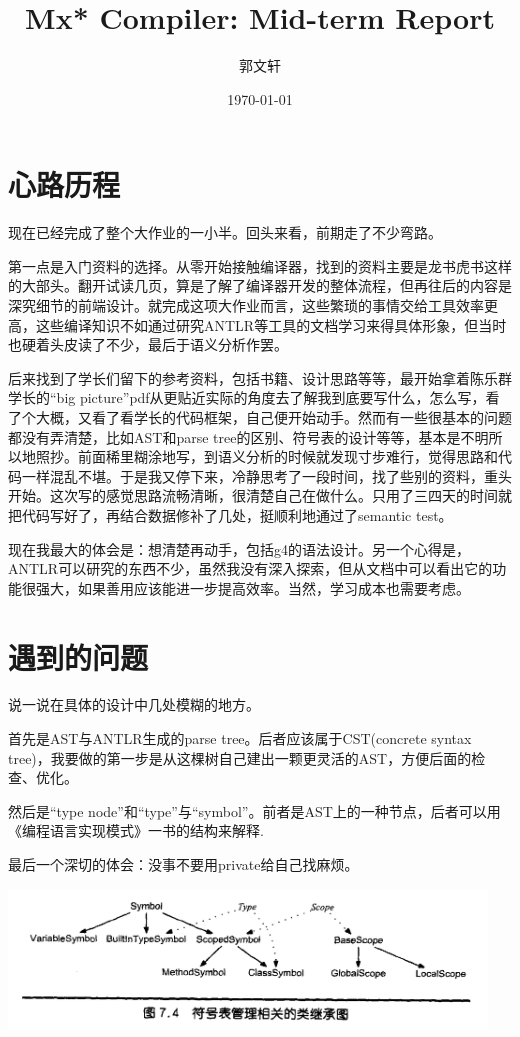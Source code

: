 \documentclass[a4paper]{article}
\title{Mx* Compiler: Mid-term Report}
\author{郭文轩}
\date{\today}
\begin{document}
\maketitle

\section{心路历程}
现在已经完成了整个大作业的一小半。回头来看，前期走了不少弯路。

第一点是入门资料的选择。从零开始接触编译器，找到的资料主要是龙书虎书这样的大部头。翻开试读几页，算是了解了编译器开发的整体流程，但再往后的内容是深究细节的前端设计。就完成这项大作业而言，这些繁琐的事情交给工具效率更高，这些编译知识不如通过研究ANTLR等工具的文档学习来得具体形象，但当时也硬着头皮读了不少，最后于语义分析作罢。

后来找到了学长们留下的参考资料，包括书籍、设计思路等等，最开始拿着陈乐群学长的``big picture''pdf从更贴近实际的角度去了解我到底要写什么，怎么写，看了个大概，又看了看学长的代码框架，自己便开始动手。然而有一些很基本的问题都没有弄清楚，比如AST和parse tree的区别、符号表的设计等等，基本是不明所以地照抄。前面稀里糊涂地写，到语义分析的时候就发现寸步难行，觉得思路和代码一样混乱不堪。于是我又停下来，冷静思考了一段时间，找了些别的资料，重头开始。这次写的感觉思路流畅清晰，很清楚自己在做什么。只用了三四天的时间就把代码写好了，再结合数据修补了几处，挺顺利地通过了semantic test。

现在我最大的体会是：想清楚再动手，包括g4的语法设计。另一个心得是，ANTLR可以研究的东西不少，虽然我没有深入探索，但从文档中可以看出它的功能很强大，如果善用应该能进一步提高效率。当然，学习成本也需要考虑。

\section{遇到的问题}
说一说在具体的设计中几处模糊的地方。

首先是AST与ANTLR生成的parse tree。后者应该属于CST(concrete syntax tree)，我要做的第一步是从这棵树自己建出一颗更灵活的AST，方便后面的检查、优化。

然后是``type node''和``type''与``symbol''。前者是AST上的一种节点，后者可以用《编程语言实现模式》一书的结构来解释.

最后一个深切的体会：没事不要用private给自己找麻烦。

\includegraphics[width=5in]{symbol.png}
\end{document}
